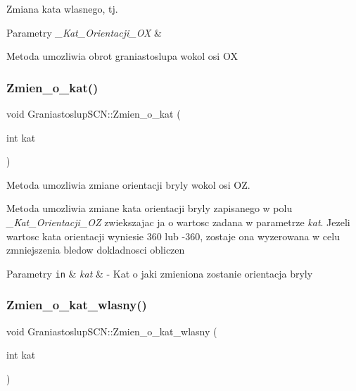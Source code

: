 Zmiana kata wlasnego, tj. 


\begin{DoxyParams}{Parametry}
{\em \+\_\+\+Kat\+\_\+\+Orientacji\+\_\+\+OX} & \\
\hline
\end{DoxyParams}
Metoda umozliwia obrot graniastoslupa wokol osi OX \mbox{\label{classGraniastoslupSCN_af074e119fe4e8a34d4be489d4d5512fe}} 
\subsubsection{\texorpdfstring{Zmien\+\_\+o\+\_\+kat()}{Zmien\_o\_kat()}}
{\footnotesize\ttfamily void Graniastoslup\+S\+C\+N\+::\+Zmien\+\_\+o\+\_\+kat (\begin{DoxyParamCaption}\item[{int}]{kat }\end{DoxyParamCaption})}



Metoda umozliwia zmiane orientacji bryly wokol osi OZ. 

Metoda umozliwia zmiane kata orientacji bryly zapisanego w polu {\itshape \+\_\+\+Kat\+\_\+\+Orientacji\+\_\+\+OZ} zwiekszajac ja o wartosc zadana w parametrze {\itshape kat}. Jezeli wartosc kata orientacji wyniesie 360 lub -\/360, zostaje ona wyzerowana w celu zmniejszenia bledow dokladnosci obliczen


\begin{DoxyParams}[1]{Parametry}
\mbox{\tt in}  & {\em kat} & -\/ Kat o jaki zmieniona zostanie orientacja bryly \\
\hline
\end{DoxyParams}
\mbox{\label{classGraniastoslupSCN_a66b1dda997b41aaa596ad6b953f06c8c}} 
\subsubsection{\texorpdfstring{Zmien\+\_\+o\+\_\+kat\+\_\+wlasny()}{Zmien\_o\_kat\_wlasny()}}
{\footnotesize\ttfamily void Graniastoslup\+S\+C\+N\+::\+Zmien\+\_\+o\+\_\+kat\+\_\+wlasny (\begin{DoxyParamCaption}\item[{int}]{kat }\end{DoxyParamCaption})}



